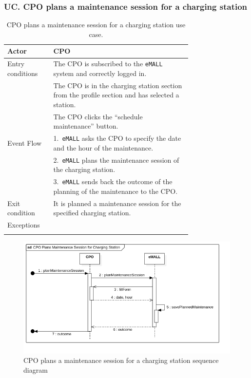 \subsubsection*{UC\cuc . CPO plans a maintenance session for a charging station}
\begin{center}
    \begin{longtable}{lp{0.75\linewidth}}
        \hline
        Actor            & CPO                                                                                             \\
        \hline
        Entry conditions & The CPO is subscribed to the \verb|eMALL| system and correctly logged in.                       \\
        & The CPO is in the charging station section from the profile section and has selected a station. \\
        & The CPO clicks the ``schedule maintenance'' button.                                             \\
        \hline
        Event Flow       & 1.\ \verb|eMALL| asks the CPO to specify the date and the hour of the maintenance.              \\
        & 2.\ \verb|eMALL| plans the maintenance session of the charging station.                         \\
        & 3.\ \verb|eMALL| sends back the outcome of the planning of the maintenance to the CPO.          \\
        \hline
        Exit condition   & It is planned a maintenance session for the specified charging station.                         \\
        \hline
        Exceptions       &                                                                                                 \\
        \hline
        \caption{CPO plans a maintenance session for a charging station use case.}
        \label{tab: CPO_plans_maintenance_use_case}
    \end{longtable}
    \begin{figure} [H]
        \begin{center}
            \includegraphics[width=0.9\linewidth]{Images/SequenceDiagrams/cpo_plans_maintenance_session_for_charging_station}
            \caption{CPO plans a maintenance session for a charging station sequence diagram}
            \label{fig: cpo_plans_maintenance_seq_diag}
        \end{center}
    \end{figure}
\end{center}

